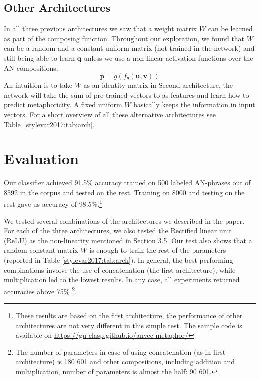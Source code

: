 \subsection{Other Architectures}
In all three previous architectures we saw that a weight matrix $W$ can be learned as part of the composing function. Throughout our exploration, we found that $W$ can be a random and a constant uniform matrix (not trained in the network) and still being able to learn $\mathbf{q}$ unless we use a non-linear activation functions over the AN compositions. 
\begin{equation}
\mathbf{p} = g(f_{\theta}(\mathbf{u}, \mathbf{v}))
\end{equation}
An intuition is to take $W$ as an identity matrix in Second architecture, the network will take the sum of pre-trained vectors to as features and learn how to predict metaphoricity. A fixed uniform $W$ basically keeps the information in input vectors. For a short overview of all these alternative architectures see Table~\ref{stylevar2017:tab:arch}.

\section{Evaluation}

Our classifier achieved 91.5\% accuracy trained on 500 labeled AN-phrases out of 8592 in the corpus and tested on the rest. Training on 8000 and testing on the rest gave us accuracy of 98.5\%.\footnote{These results are based on the first architecture, the performance of other architectures are not very different in this simple test. The sample code is available on \url{https://gu-clasp.github.io/anvec-metaphor/}}

We tested several combinations of the architectures we described in the paper. For each of the three architectures, we also tested the Rectified linear unit (ReLU) as the non-linearity mentioned in Section 3.5. Our test also shows that a random constant matrix $W$ is enough to train the rest of the parameters (reported in Table \ref{stylevar2017:tab:arch}). In general, the best performing combinations involve the use of concatenation (the first architecture), while multiplication led to the lowest results. In any case, all experiments returned accuracies above 75\% \footnote{The number of parameters in case of using concatenation (as in first architecture) is 180 601 and other compositions, including addition and multiplication, number of parameters is almost the half: 90 601.}. 

